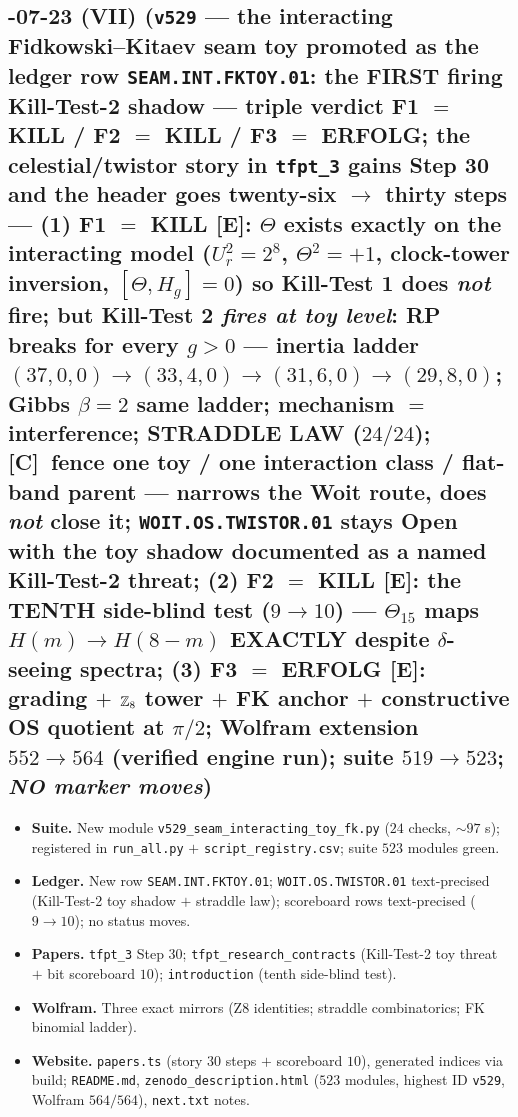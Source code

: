 \documentclass[11pt]{article}
\providecommand{\mE}{\textbf{[E]}}\providecommand{\mC}{\textbf{[C]}}
\begin{document}
\subsection*{-07-23 (VII) (\texttt{v529} --- the interacting Fidkowski--Kitaev seam toy promoted as the ledger row \texttt{SEAM.INT.FKTOY.01}: the FIRST firing Kill-Test-2 shadow --- triple verdict F1 $=$ KILL / F2 $=$ KILL / F3 $=$ ERFOLG; the celestial/twistor story in \texttt{tfpt\_3} gains Step 30 and the header goes twenty-six $\to$ thirty steps --- (1) F1 $=$ KILL \mE: $\Theta$ exists exactly on the interacting model ($U_r^2=2^8$, $\Theta^2=+1$, clock-tower inversion, $[\Theta,H_g]=0$) so Kill-Test 1 does \emph{not} fire; but Kill-Test 2 \emph{fires at toy level}: RP breaks for every $g>0$ --- inertia ladder $(37,0,0)\to(33,4,0)\to(31,6,0)\to(29,8,0)$; Gibbs $\beta=2$ same ladder; mechanism $=$ interference; STRADDLE LAW ($24/24$); \mC\ fence one toy / one interaction class / flat-band parent --- narrows the Woit route, does \emph{not} close it; \texttt{WOIT.OS.TWISTOR.01} stays Open with the toy shadow documented as a named Kill-Test-2 threat; (2) F2 $=$ KILL \mE: the TENTH side-blind test ($9\to10$) --- $\Theta_{15}$ maps $H(m)\to H(8-m)$ EXACTLY despite $\delta$-seeing spectra; (3) F3 $=$ ERFOLG \mE: grading $+$ $\mathbb{Z}_8$ tower $+$ FK anchor $+$ constructive OS quotient at $\pi/2$; Wolfram extension $552\to564$ (verified engine run); suite $519\to523$; \emph{NO marker moves})}
\begin{itemize}[leftmargin=1.5em]
\item \textbf{Suite.} New module \texttt{v529\_seam\_interacting\_toy\_fk.py} ($24$ checks, $\sim97$ s);
registered in \texttt{run\_all.py} $+$ \texttt{script\_registry.csv}; suite $523$ modules green.
\item \textbf{Ledger.} New row \texttt{SEAM.INT.FKTOY.01}; \texttt{WOIT.OS.TWISTOR.01} text-precised
(Kill-Test-2 toy shadow $+$ straddle law); scoreboard rows text-precised ($9\to10$); no status moves.
\item \textbf{Papers.} \texttt{tfpt\_3} Step 30; \texttt{tfpt\_research\_contracts} (Kill-Test-2 toy
threat $+$ bit scoreboard $10$); \texttt{introduction} (tenth side-blind test).
\item \textbf{Wolfram.} Three exact mirrors (Z8 identities; straddle combinatorics; FK binomial ladder).
\item \textbf{Website.} \texttt{papers.ts} (story $30$ steps $+$ scoreboard $10$), generated indices via build;
\texttt{README.md}, \texttt{zenodo\_description.html} ($523$ modules, highest ID \texttt{v529}, Wolfram $564/564$),
\texttt{next.txt} notes.
\end{itemize}
\end{document}
